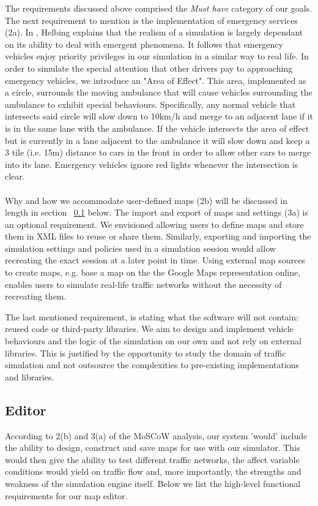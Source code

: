 The requirements discussed above comprised the \textit{Must have} category of our goals. The next requirement to mention is the implementation of emergency services (2a). In \cite{helbing2013agent}, Helbing explains that the realism of a simulation is largely dependant on its ability to deal with emergent phenomena. It follows that emergency vehicles enjoy priority privileges in our simulation in a similar way to real life. In order to simulate the special attention that other drivers pay to approaching emergency vehicles, we introduce an "Area of Effect". This area, implemented as a circle, surrounds the moving ambulance that will cause vehicles surrounding the ambulance to exhibit special behaviours. Specifically, any normal vehicle that intersects said circle will slow down to 10km/h and merge to an adjacent lane if it is in the same lane with the ambulance. If the vehicle intersects the area of effect but is currently in a lane adjacent to the ambulance it will slow down and keep a 3 tile (i.e. 15m) distance to cars in the front in order to allow other cars to merge into its lane. Emergency vehicles ignore red lights whenever the intersection is clear.
\\\\
Why and how we accommodate user-defined maps (2b) will be discussed in length in section ~\ref{ss:req-editor} below. The import and export of maps and settings (3a) is an optional requirement. We envisioned allowing users to define maps and store them in XML files to reuse or share them. Similarly, exporting and importing the simulation settings and policies used in a simulation session would allow recreating the exact session at a later point in time. Using external map sources to create maps, e.g. base a map on the the Google Maps representation online, enables users to simulate real-life traffic networks without the necessity of recreating them.

The last mentioned requirement, is stating what the software will not contain: reused code or third-party libraries. We aim to design and implement vehicle behaviours and the logic of the simulation on our own and not rely on external libraries. This is justified by the opportunity to study the domain of traffic simulation and not outsource the complexities to pre-existing implementations and libraries. 
\subsection{Editor}\label{ss:req-editor}
According to 2(b) and 3(a) of the MoSCoW analysis, our system 'would' include the ability to design, construct and save maps for use with our simulator.  This would then give the ability to test different traffic networks, the affect variable conditions would yield on traffic flow and, more importantly, the strengths and weakness of the simulation engine itself. Below we list the high-level functional requirements for our map editor.


